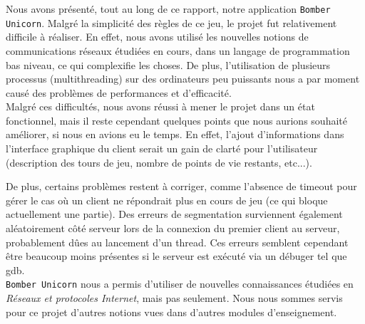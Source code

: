 Nous avons présenté, tout au long de ce rapport, notre application \texttt{Bomber Unicorn}. Malgré la simplicité des règles de ce jeu, le projet fut relativement difficile à réaliser. En effet, nous avons utilisé les nouvelles notions de communications réseaux étudiées en cours, dans un langage de programmation bas niveau, ce qui complexifie les choses. De plus, l'utilisation de plusieurs processus (multithreading) sur des ordinateurs peu puissants nous a par moment causé des problèmes de performances et d'efficacité.\\

 Malgré ces difficultés, nous avons réussi à mener le projet dans un état fonctionnel, mais il reste cependant quelques points que nous aurions souhaité améliorer, si nous en avions eu le temps. En effet, l'ajout d'informations dans l'interface graphique du client serait un gain de clarté pour l'utilisateur (description des tours de jeu, nombre de points de vie restants, etc...).
 
 De plus, certains problèmes restent à corriger, comme l'absence de timeout pour gérer le cas où un client ne répondrait plus en cours de jeu (ce qui bloque actuellement une partie). Des erreurs de segmentation surviennent également aléatoirement côté serveur lors de la connexion du premier client au serveur, probablement dûes au lancement d'un thread. Ces erreurs semblent cependant être beaucoup moins présentes si le serveur est exécuté via un débuger tel que gdb.\\

\texttt{Bomber Unicorn} nous a permis d'utiliser de nouvelles connaissances étudiées en \textit{Réseaux et protocoles Internet}, mais pas seulement. Nous nous sommes servis pour ce projet d'autres notions vues dans d'autres modules d'enseignement.